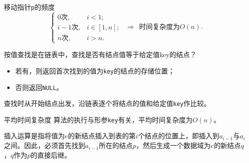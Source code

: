 \begin{frame}[fragile]\ft{\subsecname}
\begin{block}{移动指针{\tt p}的频度}
\[\left\{
\begin{array}{rl}
0\mbox{次},& i<1;\\[0.1in]
i-1\mbox{次}, & i  \in [1,n];\\[0.1in]
n\mbox{次}, & i>n.
\end{array}
\right.
~~\Rightarrow~~\mbox{时间复杂度为}O(n).
\] 
\end{block}

\end{frame}


\begin{frame}\ft{\subsecname}
 
按值查找是在链表中，查找是否有结点值等于给定值key的结点？
\begin{itemize}
\item
若有，则返回首次找到的值为{\tt key}的结点的存储位置；
\item
否则返回{\tt NULL}。
\end{itemize}
查找时从开始结点出发，沿链表逐个将结点的值和给定值{\tt key}作比较。

\end{frame}

\begin{frame}[fragile]\ft{\subsecname}


\end{frame}

\begin{frame}[fragile]\ft{\subsecname}

\begin{block}{平均时间复杂度}
算法的执行与形参{\tt key}有关，平均时间复杂度为$O(n)$。
\end{block}

\end{frame}


\begin{frame}\ft{\subsecname}
 
插入运算是指将值为$e$的新结点插入到表的第$i$个结点的位置上，即插入到$a_{i-1}$与$a_i$之间。因此，必须首先找到$a_{i-1}$所在的结点$p$，然后生成一个数据域为$e$的新结点$q$，$q$作为$p$的直接后继。
\end{frame}

